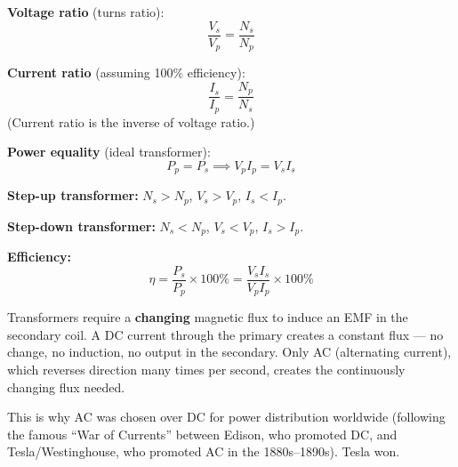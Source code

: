 \begin{diagbox}
\begin{center}
\end{center}
\end{diagbox}

\begin{lawbox}
\textbf{Voltage ratio} (turns ratio):
\[
  \frac{V_s}{V_p} = \frac{N_s}{N_p}
\]

\textbf{Current ratio} (assuming 100\% efficiency):
\[
  \frac{I_s}{I_p} = \frac{N_p}{N_s}
\]
(Current ratio is the inverse of voltage ratio.)

\textbf{Power equality} (ideal transformer):
\[
  P_p = P_s \implies V_p I_p = V_s I_s
\]

\textbf{Step-up transformer:} $N_s > N_p$,
$V_s > V_p$, $I_s < I_p$.

\textbf{Step-down transformer:} $N_s < N_p$,
$V_s < V_p$, $I_s > I_p$.

\textbf{Efficiency:}
\[
  \eta = \frac{P_s}{P_p} \times 100\%
  = \frac{V_s I_s}{V_p I_p} \times 100\%
\]
\end{lawbox}

\begin{keybox}
Transformers require a \textbf{changing} magnetic
flux to induce an EMF in the secondary coil. A DC
current through the primary creates a constant flux
--- no change, no induction, no output in the
secondary. Only AC (alternating current), which
reverses direction many times per second, creates
the continuously changing flux needed.

This is why AC was chosen over DC for power
distribution worldwide (following the famous
``War of Currents'' between Edison, who promoted
DC, and Tesla/Westinghouse, who promoted AC in
the 1880s--1890s). Tesla won.
\end{keybox}

